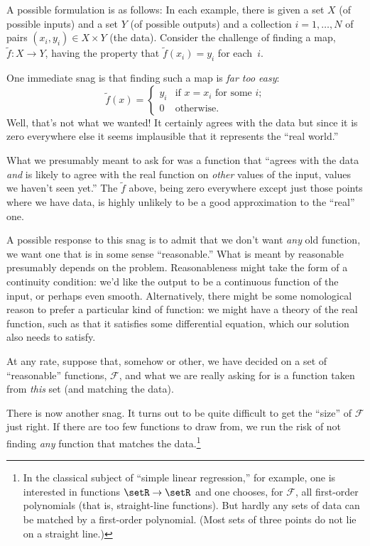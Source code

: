 \documentclass[11pt, a4paper]{article}
\begin{document}
A possible formulation is as follows: In each example, there is given
a set $X$ (of possible inputs) and a set $Y$ (of possible outputs) and
a collection $i=1,\dots,N$ of pairs $(x_i, y_i)\in X\times Y$ (the
data). Consider the challenge of finding a map, $\tilde{f}\colon X\to
Y$, having the property that $\tilde{f}(x_i)= y_i$ for each~$i$.

One immediate snag is that finding such a map is \emph{far too easy}:
\begin{equation*}
  \tilde{f}(x) =
  \begin{cases}
    y_i & \text{if $x = x_i$ for some $i$;} \\
      0 & \text{otherwise}.
  \end{cases}
\end{equation*}
Well, that's not what we wanted! It certainly agrees with the data but
since it is zero everywhere else it seems implausible that it
represents the “real world.”

What we presumably meant to ask for was a function that “agrees with
the data \emph{and} is likely to agree with the real function on
\emph{other} values of the input, values we haven't seen yet.” The
$\tilde{f}$ above, being zero everywhere except just those points
where we have data, is highly unlikely to be a good approximation to
the “real” one.

A possible response to this snag is to admit that we don't want
\emph{any} old function, we want one that is in some sense
“reasonable.” What is meant by reasonable presumably depends on the
problem. Reasonableness might take the form of a continuity condition:
we'd like the output to be a continuous function of the input, or
perhaps even smooth. Alternatively, there might be some nomological
reason to prefer a particular kind of function: we might have a theory
of the real function, such as that it satisfies some differential
equation, which our solution also needs to satisfy.

At any rate, suppose that, somehow or other, we have decided on a set
of “reasonable” functions, $\mathcal{F}$, and what we are really asking for is a
function taken from \emph{this} set (and matching the data).

There is now another snag. It turns out to be quite difficult to get
the “size” of $\mathcal{F}$ just right. If there are too few functions to draw
from, we run the risk of not finding \emph{any} function that matches
the data.\footnote{In the classical subject of “simple linear
regression,” for example, one is interested in functions $\setR \to
\setR$ and one chooses, for $\mathcal{F}$, all first-order polynomials (that is,
straight-line functions). But hardly any sets of data can be matched
by a first-order polynomial. (Most sets of three points do not lie on
a straight line.)}
\end{document}
